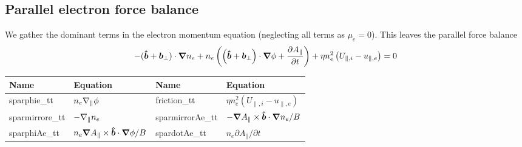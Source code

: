 \subsection{Parallel electron force balance}
We gather the dominant terms in the electron momentum equation (neglecting all terms as $\mu_e=0$). This leaves the parallel force balance
\begin{align}
    -(\bm{\hat{b}} + {\boldsymbol{b}}_\perp) \cdot{\boldsymbol{\nabla}} n_e +n_e\left( \left( \bm{\hat{b}} + {\boldsymbol{b}}_\perp \right) \cdot{\boldsymbol{\nabla}} \phi + \frac{\partial A_\parallel}{\partial t} \right) +\eta n_e^2 \left( U_{\parallel,i} - u_{\parallel,e}\right) = 0
\end{align}
\begin{longtable}{llll}
\toprule
\rowcolor{gray!50}\textbf{Name} &  \textbf{Equation} &
\textbf{Name} &  \textbf{Equation}\\
\midrule
    sparphie\_tt & $n_e\nabla_\parallel \phi$ &
    friction\_tt & $ \eta n_e^2(U_{\parallel,i}-u_{\parallel,e})$ \\
    sparmirrore\_tt & $-\nabla_\parallel n_e$ &
    sparmirrorAe\_tt & $-{\boldsymbol{\nabla}} A_\parallel \times \bm{\hat{b}} \cdot{\boldsymbol{\nabla}} n_e /B$ \\
    sparphiAe\_tt & $n_e {\boldsymbol{\nabla}} A_\parallel \times \bm{\hat{b}} \cdot{\boldsymbol{\nabla}} \phi /B$ &
    spardotAe\_tt & $ n_e \partial A_\parallel /\partial t$ \\
\bottomrule
\end{longtable}




